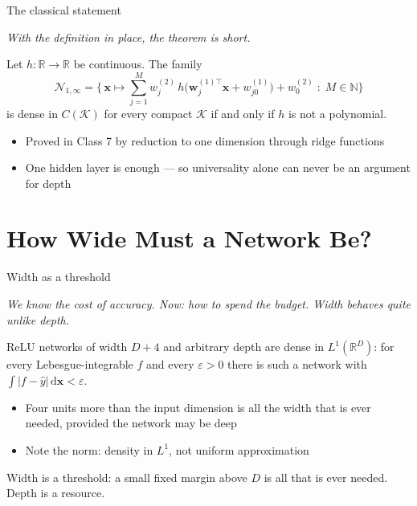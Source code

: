 \documentclass[aspectratio=169, 11pt]{beamer}
\newcommand{\bridge}[1]{%
  {\scriptsize\itshape\color{mcMuted} #1\par}\vspace{0.35em}}
\begin{document}
\begin{frame}{The classical statement}
  \bridge{With the definition in place, the theorem is short.}
  \begin{theorem}
    {\small Let $h:\mathbb{R}\to\mathbb{R}$ be continuous. The family
    \[
      \mathcal{N}_{1,\infty}
      = \Big\{\,\mathbf{x}\mapsto \sum_{j=1}^{M} w^{(2)}_j\,
        h\big(\mathbf{w}_j^{(1)\top}\mathbf{x}+w^{(1)}_{j0}\big)
        + w^{(2)}_0 \;:\; M\in\mathbb{N} \Big\}
    \]
    is dense in $C(\mathcal{K})$ for every compact $\mathcal{K}$
    \alert{if and only if $h$ is not a polynomial}.}
  \end{theorem}
  \vspace{-0.05em}
  {\footnotesize
  \begin{itemize}\setlength{\itemsep}{0pt}
    \item Proved in Class 7 by reduction to one dimension through
          \alert{ridge functions}
    \item \alert{One hidden layer is enough} --- so universality alone
          can never be an argument for depth
  \end{itemize}}
\end{frame}

\section{How Wide Must a Network Be?}

\begin{frame}{Width as a threshold}
  \bridge{We know the cost of accuracy. Now: how to spend the budget.
  Width behaves quite unlike depth.}
  \vspace{0.15em}
  \begin{theorem}
    {\small ReLU networks of width $D+4$ and \alert{arbitrary depth} are
    dense in $L^{1}(\mathbb{R}^{D})$: for every Lebesgue-integrable $f$
    and every $\varepsilon>0$ there is such a network with
    $\int|f-\hat y|\,\mathrm{d}\mathbf{x}<\varepsilon$.}
  \end{theorem}
  \vspace{0.5em}
  {\small
  \begin{itemize}\setlength{\itemsep}{0pt}
    \item Four units more than the input dimension is \alert{all} the
          width that is ever needed, provided the network may be deep
    \item Note the norm: density in $L^{1}$, not uniform
          approximation
  \end{itemize}}
  \vspace{0.3em}
  \begin{redhighlight}
    {\small \alert{Width is a threshold}: a small fixed margin above
    $D$ is all that is ever needed. \alert{Depth is a resource}.}
  \end{redhighlight}
\end{frame}
\end{document}
